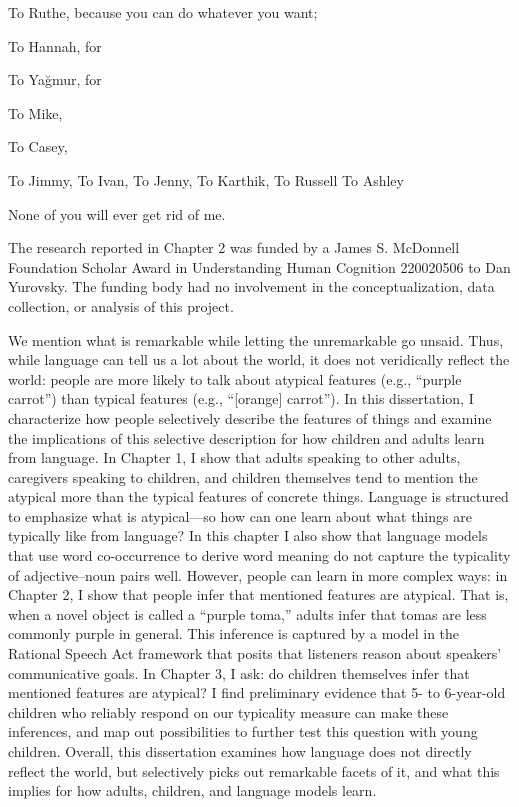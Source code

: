 \documentclass{ucetd}
\begin{document}
To Ruthe, because you can do whatever you want;

To Hannah, for 

To Ya\u{g}mur, for 

To Mike, 

To Casey,

To Jimmy,
To Ivan,
To Jenny,
To Karthik,
To Russell
To Ashley


None of you will ever get rid of me.

The research reported in Chapter 2 was funded by a James S. McDonnell Foundation Scholar Award in Understanding Human Cognition 220020506 to Dan Yurovsky. The funding body had no involvement in the conceptualization, data collection, or analysis of this project.

\abstract
We mention what is remarkable while letting the unremarkable go unsaid. Thus, while language can tell us a lot about the world, it does not veridically reflect the world: people are more likely to talk about atypical features (e.g., ``purple carrot'') than typical features (e.g., ``[orange] carrot''). In this dissertation, I characterize how people selectively describe the features of things and examine the implications of this selective description for how children and adults learn from language. In Chapter 1, I show that adults speaking to other adults, caregivers speaking to children, and children themselves tend to mention the atypical more than the typical features of concrete things. Language is structured to emphasize what is atypical—so how can one learn about what things are typically like from language? In this chapter I also show that language models that use word co-occurrence to derive word meaning do not capture the typicality of adjective–noun pairs well. However, people can learn in more complex ways: in Chapter 2, I show that people infer that mentioned features are atypical. That is, when a novel object is called a ``purple toma,'' adults infer that tomas are less commonly purple in general. This inference is captured by a model in the Rational Speech Act framework that posits that listeners reason about speakers' communicative goals. In Chapter 3, I ask: do children themselves infer that mentioned features are atypical? I find preliminary evidence that 5- to 6-year-old children who reliably respond on our typicality measure can make these inferences, and map out possibilities to further test this question with young children. Overall, this dissertation examines how language does not directly reflect the world, but selectively picks out remarkable facets of it, and what this implies for how adults, children, and language models learn.
\end{document}
